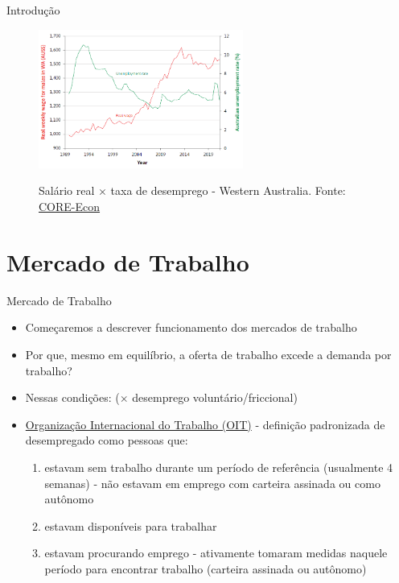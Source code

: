 \documentclass[10pt]{beamer}
\begin{document}
\begin{frame}
    {Introdução}
    \begin{figure}
        \centering
        \href{https://www.core-econ.org/the-economy/book/text/09.html}{\includegraphics[width=0.6\textwidth]{./figures/aula10_fig2.PNG}}
        \caption{Salário real $\times$ taxa de desemprego - Western Australia. Fonte: \href{https://www.core-econ.org/the-economy/book/text/09.html}{CORE-Econ}}
    \end{figure}
\end{frame}

\section{Mercado de Trabalho}
\begin{frame}{Mercado de Trabalho}
    \begin{itemize}
        \item Começaremos a descrever funcionamento dos mercados de trabalho\bigskip
        \item Por que, mesmo em equilíbrio, a oferta de trabalho excede a demanda por trabalho?\bigskip
        \item Nessas condições:  ($\times$ desemprego voluntário/friccional)\bigskip
        \item \href{http://www.ilo.org/}{Organização Internacional do Trabalho (OIT)} - definição padronizada de desempregado como pessoas que:\medskip
        \begin{enumerate}
            \item estavam sem trabalho durante um período de referência (usualmente 4 semanas) - não estavam em emprego com carteira assinada ou como autônomo\medskip
            \item estavam disponíveis para trabalhar\medskip
            \item estavam procurando emprego - ativamente tomaram medidas naquele período para encontrar trabalho (carteira assinada ou autônomo)
        \end{enumerate}
    \end{itemize}
\end{frame}
\end{document}
